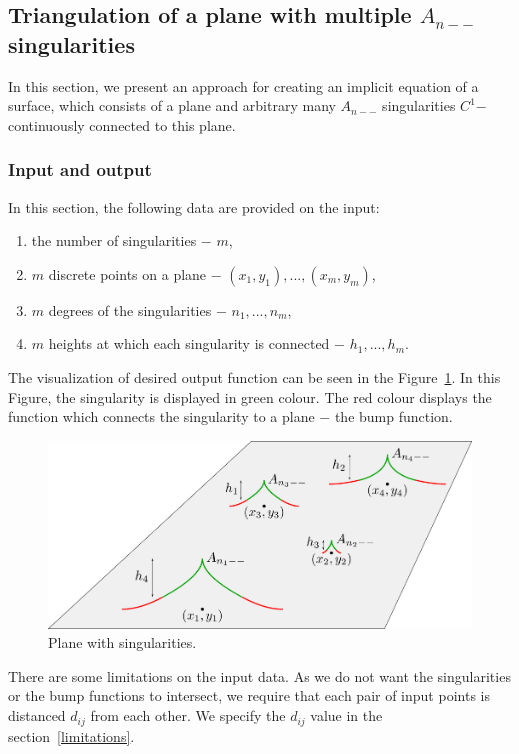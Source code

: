 \subsection{Triangulation of a plane with multiple $A_{n--}$ singularities}
In this section, we present an approach for creating an implicit equation of a
surface, which consists of a plane and arbitrary many $A_{n--}$ singularities
$C^1$$-$ continuously connected to this plane. 
\subsubsection*{Input and output}
In this section, the following data are provided on the input:
\begin{enumerate}
    \item the number of singularities $-$ $m$,
    \item $m$ discrete points on a plane $-$ $(x_1, y_1), ..., (x_m, y_m)$,
    \item $m$ degrees of the singularities $-$ $n_1, ..., n_m$,
    \item $m$ heights at which each singularity is connected $-$ $h_1, ..., h_m$.
\end{enumerate}
The visualization of desired output function can be seen in the Figure~\ref{img:22}. 
In this Figure, the singularity is displayed in green colour. The red colour 
displays the function which connects the singularity to a plane $-$ the bump function.
\begin{figure}
    \centerline{\includegraphics[scale=0.5]{images/img22}}
    \caption[Plane with singularities]
    {Plane with singularities.}
    \label{img:22}
\end{figure}
There are some limitations on the input data. As we do not want the singularities 
or the bump functions to intersect, we require that each pair of input points is
distanced $d_{ij}$ from each other. We specify the $d_{ij}$ value in the section~\ref{limitations}.
